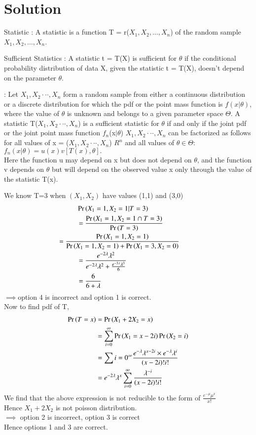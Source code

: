 \documentclass[journal,12pt,twocolumn]{IEEEtran}
\begin{document}
\section{Solution} 
\begin{definition}
     Statistic : A statistic is a function T = r($X_{1},X_{2},\dots,X_{n}$) of the random sample $X_{1},X_{2},\dots,X_{n}$.
   \end{definition}
   \begin{definition}
    Sufficient Statistics : A statistic t = T(X) is sufficient for $\theta$ if the conditional probability distribution of data X, given the statistic t = T(X), doesn't depend on the parameter $\theta$.
   \end{definition}
   \begin{theorem}\label{1}
    : Let $X_{1},X_{2} · · · , X_{n}$ form a random sample from either a continuous
distribution or a discrete distribution for which the pdf or the point mass function is $f(x\vert\theta)$,
where the value of $\theta$ is unknown and belongs to a given parameter space $\Theta$. A statistic
T($X_{1},X_{2} · · · , X_{n}$) is a sufficient statistic for $\theta$ if and only if the joint pdf or the joint point mass
function $f_{n}$(x$\vert\theta$) $X_{1},X_{2} · · · , X_{n}$ can be factorized as follows for all values of x = ($X_{1},X_{2} · · · , X_{n}$) \to
$R^{n}$ and all values of $\theta \in \Theta$:
$f_{n}(x\vert \theta) = u(x)v[T(x), \theta].$\\
Here the function u may depend on x but does not
depend on $\theta$, and the function v depends on $\theta$ but will depend on the observed value x only through the value of the statistic T(x).
   \end{theorem}
  We know T=3 when $(X_{1},X_{2})$ have values (1,1) and (3,0)
   \begin{align}
&\pr{X_{1}=1,X_{2}=1 |T=3}\\&=\frac{\pr{X_{1}=1,X_{2}=1 \cap T=3}}{\pr{T=3}}\\
&\hspace{-1 cm}=\frac{\pr{X_{1}=1,X_{2}=1}}{\pr{X_{1}=1,X_{2}=1}+\pr{X_{1}=3,X_{2}=0}}\\
&=\frac{e^{-2\lambda}\lambda^{2}}{e^{-2\lambda}\lambda^{2}+\frac{e^{-3\lambda}\lambda^{3}}{6}}\\
&=\frac{6}{6+\lambda}
\end{align}
$\implies$option 4 is incorrect and option 1 is correct.\\
Now to find pdf of T,
\begin{align}
    \Pr\left(T=x\right)&=\Pr\left(X_{1}+2X_{2}=x\right)\\
    &=\sum_{i=0}^{\infty}\Pr\left(X_{1}=x-2i\right)\Pr\left(X_{2}=i\right)\\
    &=\sum{i=0}^{\infty}\frac{e^{-\lambda}\lambda^{x-2i}\times e^{-\lambda}\lambda^{i}}{(x-2i)!i!}\\
    &=e^{-2\lambda}\lambda^{x}\sum_{i=0}^{\infty}\frac{\lambda^{-i}}{(x-2i)!i!}
\end{align}
We find that the above expression is not reducible to the form of $\frac{e^{-\mu}\mu^{x}}{x!}$\\
Hence $X_{1}+2X_{2}$ is not poisson distribution.\\
$\implies$ option 2 is incorrect, option 3 is correct\\
Hence options 1 and 3 are correct.
\end{document}
